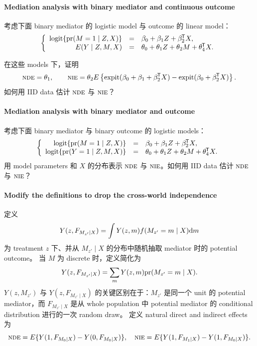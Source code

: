 \paragraph{Mediation analysis with binary mediator and continuous outcome}\label{para::logit-binary-m}
考虑下面 binary mediator 的 logistic model 与 outcome 的 linear model：
$$
\left\{\begin{array}{rcl}
\textup{logit}\{ \textup{pr}(M  = 1\mid Z, X) \}&=&  \beta_0 + \beta_1 Z + \beta_2^{\mkern-1.5mu\mathsf{T}} X, \\
E(Y\mid Z,M,X) &=& \theta_0 + \theta_1 Z + \theta_2 M +   \theta_4^{\mkern-1.5mu\mathsf{T}} X . 
\end{array}\right.
$$


在这些 models 下，证明
$$
\textsc{nde} = \theta_1  ,\qquad
\textsc{nie} = \theta_2 E \left\{  \textup{expit}(\beta_0 + \beta_1  + \beta_2^{\mkern-1.5mu\mathsf{T}} X)
-  \textup{expit}(\beta_0   + \beta_2^{\mkern-1.5mu\mathsf{T}} X)  \right\}. 
$$
如何用 IID data 估计 $\textsc{nde}$ 与 $\textsc{nie}$？






\paragraph{Mediation analysis with binary mediator and outcome}
\label{para::mediation-binaryMY}

考虑下面 binary mediator 与 binary outcome 的 logistic models：
$$
\left\{\begin{array}{rcl}
\textup{logit}\{ \textup{pr}(M  = 1\mid Z, X) \}&=&  \beta_0 + \beta_1 Z + \beta_2^{\mkern-1.5mu\mathsf{T}} X, \\
\textup{logit} \{ \textup{pr}(Y = 1 \mid Z,M,X ) \} &=& \theta_0 + \theta_1 Z + \theta_2 M +   \theta_4^{\mkern-1.5mu\mathsf{T}} X.
\end{array}\right.
$$
用 model parameters 和 $X$ 的分布表示 $\textsc{nde}$ 与 $\textsc{nie}$。如何用 IID data 估计 $\textsc{nde}$ 与 $\textsc{nie}$？



  
\paragraph{Modify the definitions to drop the cross-world independence}\label{problem::no-crossworld-modification}


定义
$$
Y(z, F_{M_{z'}\mid X}) = \int Y(z,m) f(M_{z'} = m\mid X) \textnormal{d} m
$$
为 treatment $z$ 下、并从 $M_{z'}\mid X$ 的分布中随机抽取 mediator 时的 potential outcome。
当 $M$ 为 discrete 时，定义简化为
$$
Y(z, F_{M_{z'}\mid X}) =\sum_m Y(z,m) \textup{pr}(M_{z'} = m\mid X).
$$
$Y(z,M_{z'})$ 与 $Y(z,F_{M_{z'}\mid X})$ 的关键区别在于：$M_{z'}$ 是同一个 unit 的 potential mediator，而 $F_{M_{z'}\mid X}$ 是从 whole population 中 potential mediator 的 conditional distribution 进行的一次 random draw。
定义 natural direct and indirect effects 为
$$
\textsc{nde} = E\{Y(1, F_{M_{0}\mid X})  - Y(0, F_{M_{0}\mid X})   \},\quad
\textsc{nie}  =  E\{Y(1, F_{M_{1}\mid X})  - Y(1, F_{M_{0}\mid X})   \}.
$$



